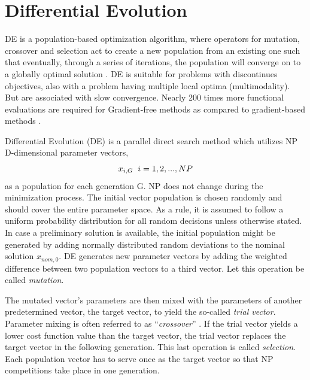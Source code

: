 
\section{Differential Evolution}

DE is a population-based optimization algorithm, where operators for mutation, crossover and selection act to create a new population from an existing one such that eventually, through a series of iterations, the population will converge on to a globally optimal solution \cite{Poole3}. DE is suitable for problems with discontinues objectives, also with a problem having multiple local optima (multimodality). But are associated with slow convergence. Nearly 200 times more functional evaluations are required for Gradient-free methods as compared to gradient-based methods \cite{oleg}.

Differential Evolution (DE) is a parallel direct search method which utilizes NP
D-dimensional parameter vectors,
$$x_{i,G} \hspace{2mm} i = 1, 2, ... , NP$$
as a population for each generation G. NP does not change during the minimization
process. The initial vector population is chosen randomly and should cover the entire
parameter space. As a rule, it is assumed to follow a uniform probability distribution for
all random decisions unless otherwise stated. In case a preliminary solution is
available, the initial population might be generated by adding normally distributed
random deviations to the nominal solution $x_{nom,0}$. DE generates new parameter
vectors by adding the weighted difference between two population vectors to a
third vector. Let this operation be called \textit{mutation}.

The mutated vector’s parameters are then mixed with the parameters of another predetermined vector, the target vector, to yield the so-called \textit{trial vector}. Parameter mixing is often referred to as “\textit{crossover}” . If the trial vector yields a lower cost function value than the target vector, the trial vector replaces the target vector in the following generation. This last operation is called \textit{selection}. Each population vector has to serve once as the target vector so that NP competitions take place in one generation.\cite{storn}

